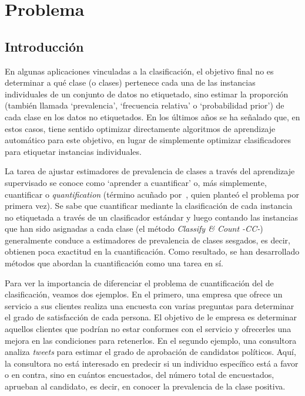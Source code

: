 \chapter{Problema}\label{problema}

\section{Introducción}\label{problema:introduccion}

En algunas aplicaciones vinculadas a la clasificación, el objetivo final no es
determinar a qué clase (o clases) pertenece cada una de las instancias
individuales de un conjunto de datos no etiquetado, sino estimar la proporción
(también llamada `prevalencia', `frecuencia relativa' o `probabilidad prior') de
cada clase en los datos no etiquetados. En los últimos años se ha señalado que,
en estos casos, tiene sentido optimizar directamente algoritmos de aprendizaje
automático para este objetivo, en lugar de simplemente optimizar clasificadores
para etiquetar instancias individuales.

La tarea de ajustar estimadores de prevalencia de clases a través del
aprendizaje supervisado se conoce como `aprender a cuantificar' o, más
simplemente, cuantificar o {\it quantification\/} (término acuñado
por~\citet{forman2005counting}, quien planteó el problema por primera vez). Se
sabe que cuantificar mediante la clasificación de cada instancia no etiquetada a
través de un clasificador estándar y luego contando las instancias que han sido
asignadas a cada clase (el método {\it Classify \& Count\/ -CC-}) generalmente
conduce a estimadores de prevalencia de clases sesgados, es decir, obtienen poca
exactitud en la cuantificación. Como resultado, se han desarrollado métodos que
abordan la cuantificación como una tarea en sí.

Para ver la importancia de diferenciar el problema de cuantificación del de
clasificación, veamos dos ejemplos. En el primero, una empresa que ofrece un
servicio a sus clientes realiza una encuesta con varias preguntas para
determinar el grado de satisfacción de cada persona. El objetivo de le empresa
es determinar aquellos clientes que podrían no estar conformes con el servicio y
ofrecerles una mejora en las condiciones para retenerlos. En el segundo ejemplo,
una consultora analiza {\it tweets\/} para estimar el grado de aprobación de
candidatos políticos. Aquí, la consultora no está interesado en predecir si un
individuo específico está a favor o en contra, sino en cuántos encuestados, del
número total de encuestados, aprueban al candidato, es decir, en conocer la
prevalencia de la clase positiva.

